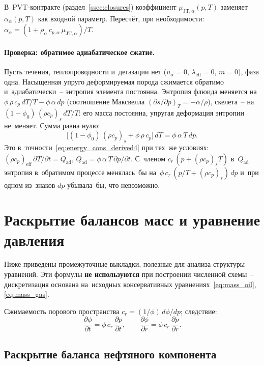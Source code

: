 \documentclass[12pt,a4paper]{article}
\newcommand{\pdt}[1]{\frac{\partial #1}{\partial t}}
\newcommand{\pdr}[1]{\frac{\partial #1}{\partial r}}
\newcommand{\mdot}{\dot{m}}
\newcommand{\rhocpeff}{(\rho c_p)_{\mathrm{eff}}}
\newcommand{\leff}{\lambda_{\mathrm{eff}}}
\newcommand{\Qad}{Q_{\mathrm{ad}}}
\begin{document}
В~PVT-контракте (раздел~\ref{ssec:closures}) коэффициент
$\mu_{\mathrm{JT},\alpha}(p,T)$ заменяет~$\alpha_\alpha(p,T)$
как входной параметр. Пересчёт, при необходимости:
$\alpha_\alpha = (1 + \rho_\alpha\,c_{p,\alpha}\,
\mu_{\mathrm{JT},\alpha})/T$.

\paragraph{Проверка: обратимое адиабатическое сжатие.}
Пусть течения, теплопроводности и~дегазации нет ($u_\alpha = 0$,
$\leff = 0$, $\mdot = 0$), фаза одна. Насыщенная упруго деформируемая
порода сжимается обратимо и~адиабатически~-- энтропия элемента
постоянна. Энтропия флюида меняется на~$\phi\,\rho\,c_p\,dT/T -
\phi\,\alpha\,dp$ (соотношение Максвелла $(\partial s/\partial p)_T =
-\alpha/\rho$), скелета~-- на~$(1-\phi_0)\,(\rho c_p)_s\,dT/T$: его
масса постоянна, упругая деформация энтропии не~меняет. Сумма равна
нулю:
\[
  \bigl[(1-\phi_0)\,(\rho c_p)_s + \phi\,\rho\,c_p\bigr]\,dT
  = \phi\,\alpha\,T\,dp.
\]
Это в~точности~\eqref{eq:energy_cons_derived4} при тех~же условиях:
$\rhocpeff\,\partial T/\partial t = \Qad$,
$\Qad = \phi\,\alpha\,T\,\partial p/\partial t$. С~членом
$c_r\,(p + (\rho c_p)_s T)$ в~$\Qad$ энтропия в~обратимом процессе
менялась~бы на~$\phi\,c_r\,(p/T + (\rho c_p)_s)\,dp$ и~при одном из~знаков
$dp$ убывала~бы, что невозможно.


\section{Раскрытие балансов масс и уравнение давления}\label{app:expansion}

Ниже приведены промежуточные выкладки, полезные для анализа
структуры уравнений. Эти формулы \textbf{не используются} при построении
численной схемы~-- дискретизация основана на~исходных консервативных
уравнениях~\eqref{eq:mass_oil}, \eqref{eq:mass_gas}.

Сжимаемость порового пространства
$c_r = (1/\phi)\,d\phi/dp$; следствие:
\begin{equation}\label{eq:dphi_dt}
  \pdt{\phi} = \phi\,c_r\,\pdt{p},
  \qquad
  \pdr{\phi} = \phi\,c_r\,\pdr{p}.
\end{equation}

\subsection{Раскрытие баланса нефтяного компонента}
\end{document}
